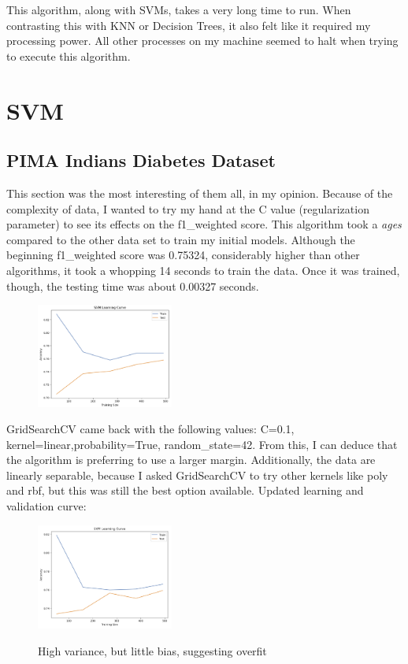 \documentclass[conference]{IEEEtran}
\begin{document}
This algorithm, along with SVMs, takes a very long time to run. When contrasting this with KNN or Decision Trees, it also felt like it required my processing power. All other processes on my machine seemed to halt when trying to execute this algorithm.

\section{SVM}

\subsection{\textbf{PIMA Indians Diabetes Dataset}}\label{AA}
This section was the most interesting of them all, in my opinion. Because of the complexity of data, I wanted to try my hand at the C value (regularization parameter) to see its effects on the f1\_weighted score. This algorithm took a \emph{ages} compared to the other data set to train my initial models. Although the beginning f1\_weighted score was 0.75324, considerably higher than other algorithms, it took a whopping 14 seconds to train the data. Once it was trained, though, the testing time was about 0.00327 seconds. 

\begin{figure}[H]
    \centering
    \includegraphics[width=0.40\textwidth]{PIMA Indian Diabetes Graphs/SVC/svc init lc.png}
    \label{fig:enter-label}
\end{figure}

GridSearchCV came back with the following values: C=0.1, kernel=linear,probability=True, random\_state=42. From this, I can deduce that the algorithm is preferring to use a larger margin. Additionally, the data are linearly separable, because I asked GridSearchCV to try other kernels like poly and rbf, but this was still the best option available. Updated learning and validation curve:

\begin{figure}[H]
    \centering
    \includegraphics[width=0.40\textwidth]{PIMA Indian Diabetes Graphs/SVC/svc fin lc.png}
    \label{fig:enter-label}
    \caption{High variance, but little bias, suggesting overfit}
\end{figure}
\end{document}
